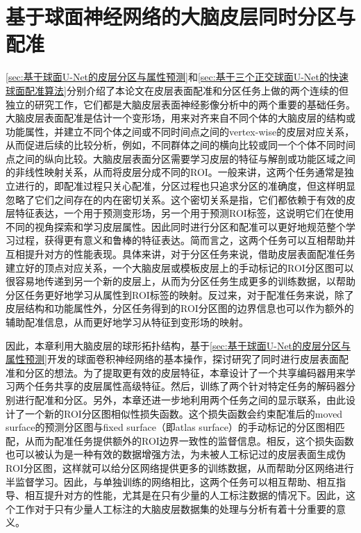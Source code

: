 


\chapter{基于球面神经网络的大脑皮层同时分区与配准}\label{sec:基于球面神经网络的大脑皮层同时分区与配准}

\ref{sec:基于球面U-Net的皮层分区与属性预测}和\ref{sec:基于三个正交球面U-Net的快速球面配准算法}分别介绍了本论文在皮层表面配准和分区任务上做的两个连续的但独立的研究工作，它们都是大脑皮层表面神经影像分析中的两个重要的基础任务。大脑皮层表面配准是估计一个变形场，用来对齐来自不同个体的大脑皮层的结构或功能属性，并建立不同个体之间或不同时间点之间的vertex-wise的皮层对应关系\cite{fischl1999high,yeo2009spherical,zhao2020unsupervised}，从而促进后续的比较分析，例如，不同群体之间的横向比较或同一个个体不同时间点之间的纵向比较。大脑皮层表面分区需要学习皮层的特征与解剖或功能区域之间的非线性映射关系，从而将皮层分成不同的ROI\cite{desikan2006automated,zhao2021sphericalDeformable,wu2018registration}。一般来讲，这两个任务通常是独立进行的\cite{li2019computational}，即配准过程只关心配准，分区过程也只追求分区的准确度，但这样明显忽略了它们之间存在的内在密切关系。这个密切关系是指，它们都依赖于有效的皮层特征表达，一个用于预测变形场，另一个用于预测ROI标签，这说明它们在使用不同的视角探索和学习皮层属性。因此同时进行分区和配准可以更好地规范整个学习过程，获得更有意义和鲁棒的特征表达。简而言之，这两个任务可以互相帮助并互相提升对方的性能表现。具体来讲，对于分区任务来说，借助皮层表面配准任务建立好的顶点对应关系，一个大脑皮层或模板皮层上的手动标记的ROI分区图可以很容易地传递到另一个新的皮层上，从而为分区任务生成更多的训练数据，以帮助分区任务更好地学习从属性到ROI标签的映射。反过来，对于配准任务来说，除了皮层结构和功能属性外，分区任务得到的ROI分区图的边界信息也可以作为额外的辅助配准信息，从而更好地学习从特征到变形场的映射。

因此，本章利用大脑皮层的球形拓扑结构，基于\ref{sec:基于球面U-Net的皮层分区与属性预测}开发的球面卷积神经网络的基本操作，探讨研究了同时进行皮层表面配准和分区的想法。为了提取更有效的皮层特征，本章设计了一个共享编码器用来学习两个任务共享的皮层属性高级特征。然后，训练了两个针对特定任务的解码器分别进行配准和分区。另外，本章还进一步地利用两个任务之间的显示联系，由此设计了一个新的ROI分区图相似性损失函数。这个损失函数会约束配准后的moved surface的预测分区图与fixed surface（即atlas surface）的手动标记的分区图相匹配，从而为配准任务提供额外的ROI边界一致性的监督信息。相反，这个损失函数也可以被认为是一种有效的数据增强方法，为未被人工标记过的皮层表面生成伪ROI分区图，这样就可以给分区网络提供更多的训练数据，从而帮助分区网络进行半监督学习\cite{xu2019deepatlas}。因此，与单独训练的网络相比，这两个任务可以相互帮助、相互指导、相互提升对方的性能，尤其是在只有少量的人工标注数据的情况下。因此，这个工作对于只有少量人工标注的大脑皮层数据集的处理与分析有着十分重要的意义。

